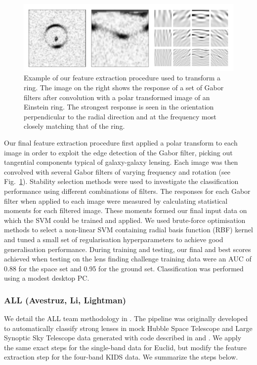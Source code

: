 \documentclass[useAMS,usenatbib]{mnras}
\begin{document}
\begin{figure}
  \centering
      \includegraphics[width=1\columnwidth]{figures/polarfilter.pdf} 
  \caption{Example of our feature extraction procedure used to transform a ring. The image on the right shows the response of a set of Gabor filters after convolution with a polar transformed image of an Einstein ring. The strongest response is seen in the orientation perpendicular to the radial direction and at the frequency most closely matching that of the ring.}
 \label{gaborring}
\end{figure}

Our final feature extraction procedure first applied a polar transform to each image in order to exploit the edge detection of the Gabor filter, picking out tangential components typical of galaxy-galaxy lensing. Each image was then convolved with several Gabor filters of varying frequency and rotation (see Fig.~\ref{gaborring}). Stability selection methods were used to investigate the classification performance using different combinations of filters. The responses for each Gabor filter when applied to each image were measured by calculating statistical moments for each filtered image. These moments formed  our final input data on which the SVM could be trained and applied. We used brute-force optimisation methods to select a non-linear SVM containing radial basis function (RBF) kernel and tuned a small set of regularisation hyperparameters to achieve good generalisation performance. During training and testing, our final and best scores achieved when testing on the lens finding challenge training data were an AUC of 0.88 for the space set and 0.95 for the ground set. Classification was performed using a modest desktop PC.

\subsubsection{ALL (Avestruz, Li, Lightman)}

We detail the ALL team methodology in \citet{avestruz_etal17}. The
pipeline was originally developed to automatically classify strong
lenses in mock Hubble Space Telescope and Large Synoptic Sky Telescope
data generated with code described in \citet{li_etal16} and
\citet{collett_15}.  We apply the same exact steps for the single-band
data for Euclid, but modify the feature extraction step for the
four-band KIDS data.  We summarize the steps below.
\end{document}
